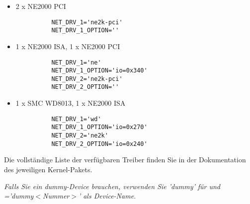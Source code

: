 \begin{description}
{\begin{itemize}
      Man sollte es hier zunächst ohne Angabe der Interrupts probieren
      und lediglich dann die Interrupts eintragen, wenn ohne Angabe
      der Interrupts die Netzwerkkarten nicht gefunden werden.

    \item 2 x NE2000 PCI
      \begin{example}
      \begin{verbatim}
          NET_DRV_1='ne2k-pci'
          NET_DRV_1_OPTION=''
      \end{verbatim}
      \end{example}
    \item  1 x NE2000 ISA, 1 x NE2000 PCI
      \begin{example}
      \begin{verbatim}
          NET_DRV_1='ne'
          NET_DRV_1_OPTION='io=0x340'
          NET_DRV_2='ne2k-pci'
          NET_DRV_2_OPTION=''
      \end{verbatim}
      \end{example}
    \item 1 x SMC WD8013, 1 x NE2000 ISA
      \begin{example}
      \begin{verbatim}
          NET_DRV_1='wd'
          NET_DRV_1_OPTION='io=0x270'
          NET_DRV_2='ne2k'
          NET_DRV_2_OPTION='io=0x240'
      \end{verbatim}
      \end{example}
    \end{itemize}

    Die vollständige Liste der verfügbaren Treiber finden Sie in der
    Dokumentation des jeweiligen Kernel-Pakets.

    \emph{Falls Sie ein dummy-Device brauchen, verwenden Sie 'dummy' für  und\\
    ='dummy$<$Nummer$>$' als Device-Name.}

    }
\end{description}
